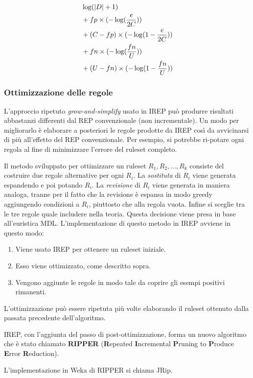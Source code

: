 \begin{align*}
	&\log(|D| + 1) \\
	&+ fp \times (-\log(\dfrac{e}{2C})) \\
	&+ (C - fp) \times (-\log(1 - \-\dfrac{e}{2C})) \\
	&+ fn \times (-\log(\dfrac{fn}{U})) \\
	&+ (U - fn) \times (-\log(1 - \dfrac{fn}{U})) \\	
\end{align*}


\subsubsection*{Ottimizzazione delle regole}
L'approccio ripetuto \textit{grow-and-simplify} usato in IREP può produrre risultati abbastanzi differenti dal REP convenzionale (non incrementale). Un modo per migliorarlo è elaborare a posteriori le regole prodotte da IREP così da avvicinarsi di più all'effetto del REP convenzionale. Per esempio, si potrebbe ri-potare ogni regola al fine di minimizzare l'errore del ruleset completo.

Il metodo sviluppato per ottimizzare un ruleset $R_1,R_2,...,R_k$ consiste del costruire due regole alternative per ogni $R_i$. La \textit{sostituta} di $R_i$ viene generata espandendo e poi potando $R_i$. La \textit{revisione} di $R_i$ viene generata in maniera analoga, tranne per il fatto che la revisione è espansa in modo greedy aggiungendo condizioni a $R_i$, piuttosto che alla regola vuota. Infine si sceglie tra le tre regole quale includere nella teoria. Questa decisione viene presa in base all'euristica MDL. L'implementazione di questo metodo in IREP avviene in questo modo:
\begin{enumerate}
	\item Viene usato IREP per ottenere un ruleset iniziale.
	\item Esso viene ottimizzato, come descritto sopra.
	\item Vengono aggiunte le regole in modo tale da coprire gli esempi positivi rimanenti.
\end{enumerate}

L'ottimizzazione può essere ripetuta più volte elaborando il ruleset ottenuto dalla passata precedente dell'algoritmo.

IREP, con l'aggiunta del passo di post-ottimizzazione, forma un nuovo algoritmo che è stato chiamato \textbf{RIPPER} (\textbf{R}epeated \textbf{I}ncremental \textbf{P}runing to \textbf{P}roduce \textbf{E}rror \textbf{R}eduction).

L'implementazione in Weka di RIPPER si chiama JRip.